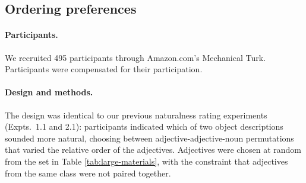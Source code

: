 \documentclass[12pt]{article}
\begin{document}
\subsection{Ordering preferences}

\paragraph{Participants.} We recruited 495 participants through Amazon.com's Mechanical Turk. Participants were compensated for their participation.

\paragraph{Design and methods.}

The design was identical to our previous naturalness rating experiments (Expts.~1.1 and 2.1): participants indicated which of two object descriptions sounded more natural, choosing between adjective-adjective-noun permutations that varied the relative order of the adjectives. Adjectives were chosen at random from the set in Table \ref{tab:large-materials}, with the constraint that adjectives from the same class were not paired together.
\end{document}
